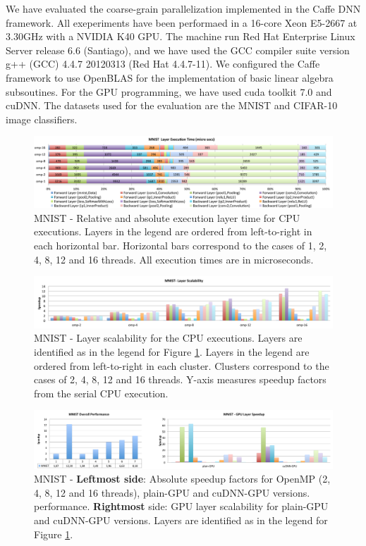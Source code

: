 We have evaluated the coarse-grain parallelization implemented in 
the Caffe DNN framework. All exeperiments have been performaed 
in a 16-core Xeon E5-2667 at 3.30GHz with a NVIDIA K40 GPU. 
The machine run Red Hat Enterprise Linux Server release 6.6 (Santiago), 
and we have used the GCC compiler suite version g++ (GCC) 4.4.7 20120313 
(Red Hat 4.4.7-11). We configured the Caffe framework to use OpenBLAS 
for the implementation of basic linear algebra subsoutines. 
For the GPU programming, we have used cuda toolkit 7.0 and cuDNN. 
The datasets used for the evaluation are the MNIST and CIFAR-10 
image classifiers.


\begin{figure}[]
\includegraphics[width=\linewidth]{figures/mnist-rel-abs-time.pdf}
\caption{MNIST - Relative and absolute execution layer time for CPU executions. Layers in the legend are ordered from left-to-right in each horizontal bar. Horizontal bars correspond to the cases of 1, 2, 4, 8, 12 and 16 threads. All execution times are in microseconds.}
\label{fig-mnist-abs-rel}
\end{figure}

\begin{figure}[]
\includegraphics[width=\textwidth]{figures/mnist-scalability-layer.pdf}
\caption{MNIST - Layer scalability for the CPU executions. Layers are identified as in the legend for Figure \ref{fig-mnist-abs-rel}. Layers in the legend are ordered from left-to-right in each cluster. Clusters correspond to the cases of 2, 4, 8, 12 and 16 threads. Y-axis measures speedup factors from the serial CPU execution.}
\label{fig-mnist-scalability}
\end{figure}

\begin{figure}[]
\includegraphics[width=\textwidth]{figures/mnist-abs-perf+gpu-layer.pdf}
\caption{MNIST - \textbf{Leftmost side}: Absolute speedup factors for OpenMP (2, 4, 8, 12 and 16 threads), plain-GPU and cuDNN-GPU versions. performance. \textbf{Rightmost} side: GPU layer scalability for plain-GPU and cuDNN-GPU versions. Layers are identified as in the legend for Figure \ref{fig-mnist-abs-rel}.}
\label{fig-mnist-overall}
\end{figure}

